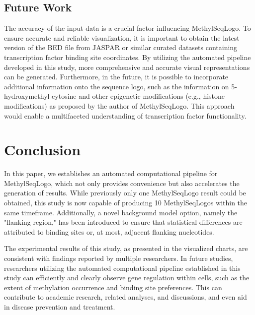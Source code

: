 \documentclass{PHlab-thesis}
\begin{document}
\section{Future Work}
The accuracy of the input data is a crucial factor influencing MethylSeqLogo. To ensure accurate and reliable visualization, it is important to obtain the latest version of the BED file from JASPAR or similar curated datasets containing transcription factor binding site coordinates. By utilizing the automated pipeline developed in this study, more comprehensive and accurate visual representations can be generated. Furthermore, in the future, it is possible to incorporate additional information onto the sequence logo, such as the information on 5-hydroxymethyl cytosine and other epigenetic modifications (e.g., histone modifications) as proposed by the author of MethylSeqLogo. This approach would enable a multifaceted understanding of transcription factor functionality.
\chapter{Conclusion}
In this paper, we establishes an automated computational pipeline for MethylSeqLogo, which not only provides convenience but also accelerates the generation of results. While previously only one MethylSeqLogo result could be obtained, this study is now capable of producing 10 MethylSeqLogos within the same timeframe. Additionally, a novel background model option, namely the "flanking region," has been introduced to ensure that statistical differences are attributed to binding sites or, at most, adjacent flanking nucleotides.

The experimental results of this study, as presented in the visualized charts, are consistent with findings reported by multiple researchers. In future studies, researchers utilizing the automated computational pipeline established in this study can efficiently and clearly observe gene regulation within cells, such as the extent of methylation occurrence and binding site preferences. This can contribute to academic research, related analyses, and discussions, and even aid in disease prevention and treatment.
\newpage
{}
\printbibliography
\end{document}
